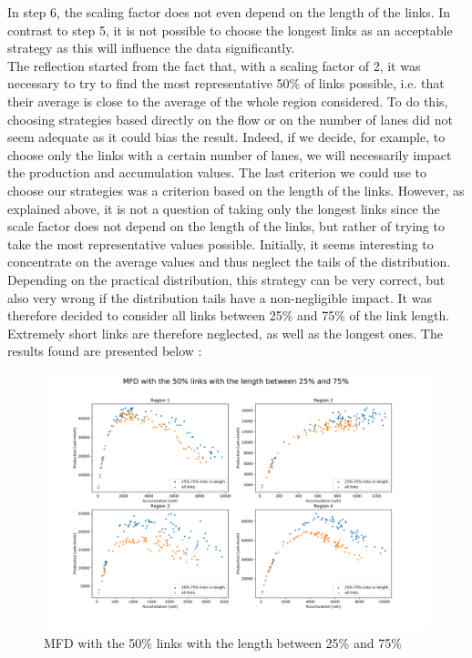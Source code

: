 \documentclass[a4paper, 12pt,oneside]{article}
\begin{document}
\smallbreak
In step 6, the scaling factor does not even depend on the length of the links. In contrast to step 5, it is not possible to choose the longest links as an acceptable strategy as this will influence the data significantly.\\ 
The reflection started from the fact that, with a scaling factor of 2, it was necessary to try to find the most representative 50\% of links possible, i.e. that their average is close to the average of the whole region considered. To do this, choosing strategies based directly on the flow or on the number of lanes did not seem adequate as it could bias the result. Indeed, if we decide, for example, to choose only the links with a certain number of lanes, we will necessarily impact the production and accumulation values. The last criterion we could use to choose our strategies was a criterion based on the length of the links. However, as explained above, it is not a question of taking only the longest links since the scale factor does not depend on the length of the links, but rather of trying to take the most representative values possible.
\smallbreak
Initially, it seems interesting to concentrate on the average values and thus neglect the tails of the distribution. Depending on the practical distribution, this strategy can be very correct, but also very wrong if the distribution tails have a non-negligible impact. It was therefore decided to consider all links between 25\% and 75\% of the link length. Extremely short links are therefore neglected, as well as the longest ones. The results found are presented below :

\begin{figure}[H]
    \begin{center}
        \includegraphics[width=18cm]{Images/step6_25_75.png}
        \caption{MFD with the 50\% links with the length between 25\% and 75\%}
        \label{MFD with the 50\% links with the length between 25\% and 75\%}
    \end{center}
\end{figure}
\end{document}
